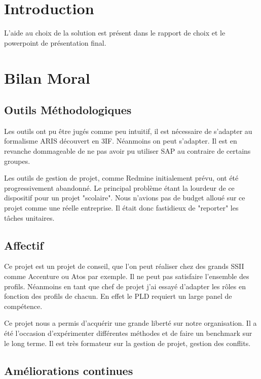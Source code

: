 \section{Introduction}

L'aide au choix de la solution est présent dans le rapport de choix et le powerpoint
de présentation final.

\section{Bilan Moral}

\subsection{Outils Méthodologiques}

Les outils ont pu être jugés comme peu intuitif, il est nécessaire de s'adapter 
au formalisme ARIS découvert en 3IF. Néanmoins on peut s'adapter. Il est en revanche
 dommageable de ne pas avoir pu utiliser SAP au contraire de certains groupes. 

Les outils de gestion de projet, comme Redmine initialement prévu, ont été progressivement
 abandonné. Le principal problème étant la lourdeur de ce dispositif pour un projet 
"scolaire". Nous n'avions pas de budget alloué sur ce projet comme une réelle entreprise.
Il était donc fastidieux de "reporter" les tâches unitaires.

\subsection{Affectif}

Ce projet est un projet de conseil, que l'on peut réaliser chez des grands SSII 
comme Accenture ou Atos par exemple. Il ne peut pas satisfaire l'ensemble des profils. 
Néanmoins en tant que chef de projet j'ai essayé d'adapter les rôles en fonction 
des profils de chacun. En effet le PLD requiert un large panel de compétence.

Ce projet nous a permis d'acquérir une grande liberté sur notre organisation. 
Il a été l'occasion d'expérimenter différentes méthodes et de faire un benchmark 
sur le long terme. Il est très formateur sur la gestion de projet, gestion des
conflits.

\subsection{Améliorations continues}

